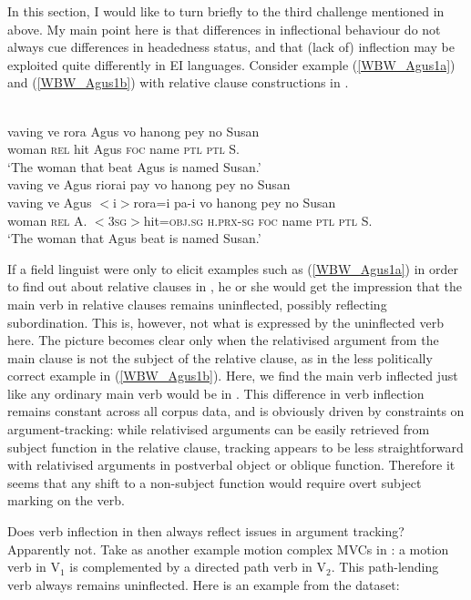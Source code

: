 In this section, I would like to turn briefly to the third challenge mentioned in  above. My main point here is that differences in inflectional behaviour do not always cue differences in headedness status, and that (lack of) inflection may be exploited quite differently in EI languages. Consider example (\ref{WBW_Agus1a}) and (\ref{WBW_Agus1b}) with relative clause constructions in .

\ea
{}\\
\ea \label{WBW_Agus1a}
\gll vaving ve rora Agus vo hanong pey no Susan \\
woman \textsc{rel} hit Agus \textsc{foc} name \textsc{ptl} \textsc{ptl} S. \\
\glft `The woman that beat Agus is named Susan.' \\ 
\newpage
\ex \label{WBW_Agus1b}
\glll vaving ve Agus riorai pay vo hanong pey no Susan \\
vaving ve Agus $<$i$>$rora=i pa-i vo hanong pey no Susan \\
woman \textsc{rel} A. $<$3\textsc{sg}$>$hit=\textsc{obj}.\textsc{sg} \textsc{h}.\textsc{prx}-\textsc{sg} \textsc{foc} name \textsc{ptl} \textsc{ptl} S. \\
\glft `The woman that Agus beat is named Susan.' \\ 
\z
\z

If a field linguist were only to elicit examples such as (\ref{WBW_Agus1a}) in order to find out about relative clauses in , he or she would get the impression that the main verb in relative clauses remains uninflected, possibly reflecting subordination. This is, however, not what is expressed by the uninflected verb here. The picture becomes clear only when the relativised argument from the main clause is not the subject of the relative clause, as in the less politically correct example in (\ref{WBW_Agus1b}). Here, we find the main verb inflected just like any ordinary main verb would be in . This difference in verb inflection remains constant across all corpus data, and is obviously driven by constraints on argument-tracking: while relativised arguments can be easily retrieved from subject function in the relative clause, tracking appears to be less straightforward with relativised arguments in postverbal object or oblique function. Therefore it seems that any shift to a non-subject function would require overt subject marking on the verb.

Does verb inflection in  then always reflect issues in argument tracking? Apparently not. Take as another example motion complex MVCs in : a motion verb in V$_1$ is complemented by a directed path verb in V$_2$. This path-lending verb always remains uninflected. Here is an example from the dataset:

